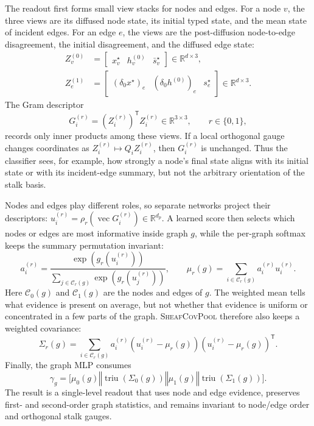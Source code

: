 \documentclass[sigconf,anonymous,review]{acmart}
\newcommand{\R}{\mathbb{R}}
\newcommand{\sheafcovpool}{\textsc{SheafCovPool}}
\newcommand{\transpose}{\mathsf{T}}
\newcommand{\concat}{\mathbin\Vert}
\begin{document}
The readout first forms small view stacks for nodes and edges.  For a node \(v\), the three views
are its diffused node state, its initial typed state, and the mean state of incident edges.  For an
edge \(e\), the views are the post-diffusion node-to-edge disagreement, the initial disagreement,
and the diffused edge state:
\begin{equation}
  \begin{aligned}
  Z_v^{(0)}
  &=\begin{bmatrix}x_v^\star&h_v^{(0)}&\bar s_v^\star\end{bmatrix}
    \in\R^{d\times3},\\
  Z_e^{(1)}
  &=\begin{bmatrix}
    (\delta_0x^\star)_e&(\delta_0h^{(0)})_e&s_e^\star
  \end{bmatrix}
    \in\R^{d\times3}.
  \end{aligned}
\end{equation}
The Gram descriptor
\[
  G_i^{(r)}=(Z_i^{(r)})^{\transpose}Z_i^{(r)}\in\R^{3\times3},
  \qquad r\in\{0,1\},
\]
records only inner products among these views.  If a local orthogonal gauge changes coordinates as
\(Z_i^{(r)}\mapsto Q_iZ_i^{(r)}\), then \(G_i^{(r)}\) is unchanged.  Thus the classifier sees, for
example, how strongly a node's final state aligns with its initial state or with its incident-edge
summary, but not the arbitrary orientation of the stalk basis.

Nodes and edges play different roles, so separate networks project their descriptors:
\(u_i^{(r)}=\rho_r(\operatorname{vec}G_i^{(r)})\in\R^{d_p}\).  A learned score then selects which
nodes or edges are most informative inside graph \(g\), while the per-graph softmax keeps the
summary permutation invariant:
\begin{equation}
  a_i^{(r)}
  =\frac{\exp(g_r(u_i^{(r)}))}
         {\sum_{j\in\mathcal{C}_r(g)}\exp(g_r(u_j^{(r)}))},
  \qquad
  \mu_r(g)=\sum_{i\in\mathcal{C}_r(g)}a_i^{(r)}u_i^{(r)} .
\end{equation}
Here \(\mathcal{C}_0(g)\) and \(\mathcal{C}_1(g)\) are the nodes and edges of \(g\).  The weighted
mean tells what evidence is present on average, but not whether that evidence is uniform or
concentrated in a few parts of the graph.  \sheafcovpool{} therefore also keeps a weighted
covariance:
\begin{equation}
  \Sigma_r(g)
  =\sum_{i\in\mathcal{C}_r(g)}a_i^{(r)}
    (u_i^{(r)}-\mu_r(g))(u_i^{(r)}-\mu_r(g))^{\transpose}.
\end{equation}
Finally, the graph MLP consumes
\begin{equation}
  \gamma_g=
  \bigl[
  \mu_0(g)\concat\operatorname{triu}(\Sigma_0(g))
  \concat\mu_1(g)\concat\operatorname{triu}(\Sigma_1(g))
  \bigr].
\end{equation}
The result is a single-level readout that uses node and edge evidence, preserves first- and
second-order graph statistics, and remains invariant to node/edge order and orthogonal stalk gauges.
\end{document}
